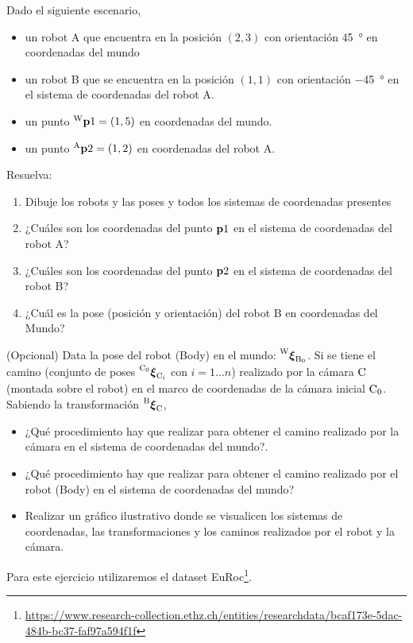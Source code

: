 \documentclass[tp]{lcc}
\begin{document}
\ejercicio Dado el siguiente escenario,
\begin{itemize}
    \item un robot A que encuentra en la posición $(2,3)$ con orientación \SI{45}{\degree} en coordenadas del mundo
    \item un robot B que se encuentra en la posición $(1,1)$ con orientación \SI{-45}{\degree} en el sistema de coordenadas del robot A.
    \item un punto $\prescript{\mathrm{\mathrm{W}}}{}{\boldsymbol{\mathbf{p}}}1 = (1,5)$ en coordenadas del mundo.
    \item un punto $\prescript{\mathrm{A}}{}{\boldsymbol{\mathbf{p}}}2 = (1,2)$ en coordenadas del robot A.
\end{itemize}
Resuelva:
\begin{enumerate}
    \item Dibuje los robots y las poses y todos los sistemas de coordenadas presentes
    \item ¿Cuáles son los coordenadas del punto $\boldsymbol{\mathbf{p}}1$ en el sistema de coordenadas del robot A?
    \item ¿Cuáles son los coordenadas del punto $\boldsymbol{\mathbf{p}}2$ en el sistema de coordenadas del robot B?
    \item ¿Cuál es la pose (posición y orientación) del robot B en coordenadas del Mundo?
\end{enumerate}

\ejercicio (Opcional) Data la pose del robot (Body) en el mundo: $\prescript{\mathrm{\mathrm{W}}}{}{{\boldsymbol{\mathbf{\xi}}}_\mathrm{\mathrm{B}_{0}}}$. Si se tiene el camino (conjunto de poses $\prescript{\mathrm{\mathrm{C}_{0}}}{}{{\boldsymbol{\mathbf{\xi}}}_\mathrm{\mathrm{C}_{i}}}$ con $i = 1 \dots n$) realizado por la cámara $\mathrm{C}$ (montada sobre el robot) en el marco de coordenadas de la cámara inicial $\mathrm{C}_{0}$. Sabiendo la transformación $\prescript{\mathrm{\mathrm{B}}}{}{{\boldsymbol{\mathbf{\xi}}}_\mathrm{\mathrm{C}}}$, 
\begin{itemize}
	\item ¿Qué procedimiento hay que realizar para obtener el camino realizado por la cámara en el sistema de coordenadas del mundo?.
	\item ¿Qué procedimiento hay que realizar para obtener el camino realizado por el robot (Body) en el sistema de coordenadas del mundo?
    \item Realizar un gráfico ilustrativo donde se visualicen los sistemas de coordenadas, las transformaciones y los caminos realizados por el robot y la cámara.
\end{itemize}


\ejercicio Para este ejercicio utilizaremos el dataset EuRoc\footnote{\url{https://www.research-collection.ethz.ch/entities/researchdata/bcaf173e-5dac-484b-bc37-faf97a594f1f}}.
\end{document}
